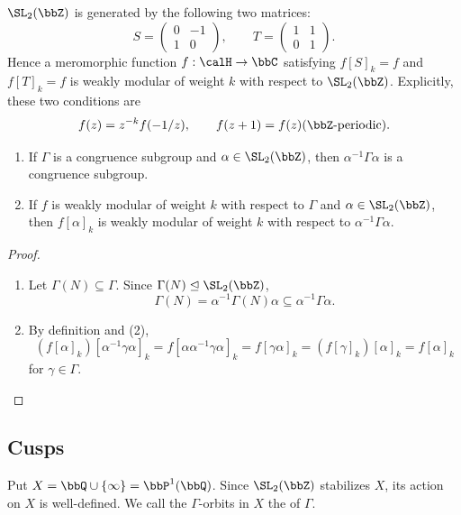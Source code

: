 \begin{example}
    $\SL_2(\bbZ)$ is generated by the following two matrices:
    \[
        S = \begin{pmatrix}0 & - 1\\ 1 & 0\end{pmatrix}, \qquad
        T = \begin{pmatrix}1 & 1\\ 0 & 1\end{pmatrix}.
    \]
    Hence a meromorphic function $f : \calH \to \bbC$ satisfying $f[S]_k = f$ and $f[T]_k = f$ is weakly modular of weight $k$ with respect to $\SL_2(\bbZ)$. Explicitly, these two conditions are
    \[
        f(z) = z^{-k}f(-1/z), \qquad f(z + 1) = f(z)(\bbZ\text{-periodic}).
    \]
\end{example}

\begin{lemma}\label{Lem:MF_conjugation}
    \leavevmode
    \begin{enumerate}[label=(\roman*)]
        \item If $\Gamma$ is a congruence subgroup and $\alpha \in \SL_2(\bbZ)$, then $\alpha^{-1}\Gamma\alpha$ is a congruence subgroup.
        \item If $f$ is weakly modular of weight $k$ with respect to $\Gamma$ and $\alpha \in \SL_2(\bbZ)$, then $f[\alpha]_k$ is weakly modular of weight $k$ with respect to $\alpha^{-1}\Gamma\alpha$.
    \end{enumerate}
\end{lemma}
\begin{proof}
    \leavevmode
    \begin{enumerate}[label=(\roman*)]
        \item Let $\Gamma(N) \subseteq \Gamma$. Since $\Gamma(N) \trianglelefteq \SL_2(\bbZ)$,
        \[
            \Gamma(N) = \alpha^{-1}\Gamma(N)\alpha \subseteq \alpha^{-1}\Gamma\alpha.
        \]
        \item By definition and (2),
        \[
            (f[\alpha]_k)[\alpha^{-1}\gamma\alpha]_k
            = f[\alpha\alpha^{-1}\gamma\alpha]_k
            = f[\gamma\alpha]_k
            = (f[\gamma]_k)[\alpha]_k = f[\alpha]_k
        \]
        for $\gamma \in \Gamma$.
    \end{enumerate}
\end{proof}

\subsection{Cusps}\label{Sec:MF_cusps}
Put $X = \bbQ \cup \{\infty\} = \bbP^1(\bbQ)$. Since $\SL_2(\bbZ)$ stabilizes $X$, its action on $X$ is well-defined. We call the $\Gamma$-orbits in $X$ the  of $\Gamma$.

